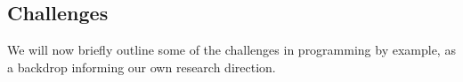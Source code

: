 \documentclass{article} %
\begin{document}




\subsection{Challenges}

We will now briefly outline some of the challenges in programming by example,
as a backdrop informing our own research direction.

\end{document}
